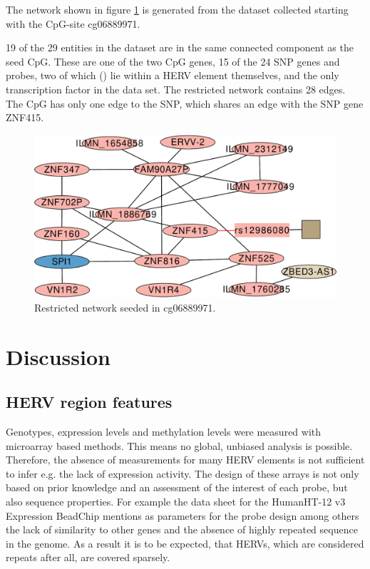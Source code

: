 \documentclass[a4paper,12pt,twoside,openright]{report}
\begin{document}
The network shown in figure \ref{fig:cg06889971.ggm.network} is generated from the dataset collected starting with the CpG-site cg06889971. 

19 of the 29 entities in the dataset are in the same connected component as the seed CpG. These are one of the two CpG genes, 15 of the 24 SNP genes and probes, two of which () lie within a HERV element themselves, and the only transcription factor in the data set. The restricted network contains 28 edges. The CpG has only one edge to the SNP, which shares an edge with the SNP gene ZNF415. 
\begin{figure}[tb]
	\includegraphics[scale = 0.6, keepaspectratio = true]{"../figures/cg06889971"}  
	\caption{Restricted network seeded in cg06889971. }
    \label{fig:cg06889971.ggm.network}
\end{figure}

\newpage
\chapter{Discussion}
\label{Discussion}

\section{HERV region features}
\label{Discussion:HERV region features}

Genotypes, expression levels and methylation levels were measured with microarray based methods. This means no global, unbiased analysis is possible. Therefore, the absence of measurements for many HERV elements is not sufficient to infer e.g. the lack of expression activity. The design of these arrays is not only based on prior knowledge and an assessment of the interest of each probe, but also sequence properties. For example the data sheet for the HumanHT-12 v3 Expression BeadChip\cite{HumanHT} mentions as parameters for the probe design among others the lack of similarity to other genes and the absence of highly repeated sequence in the genome. As a result it is to be expected, that HERVs, which are considered repeats after all, are covered sparsely. 
\end{document}
